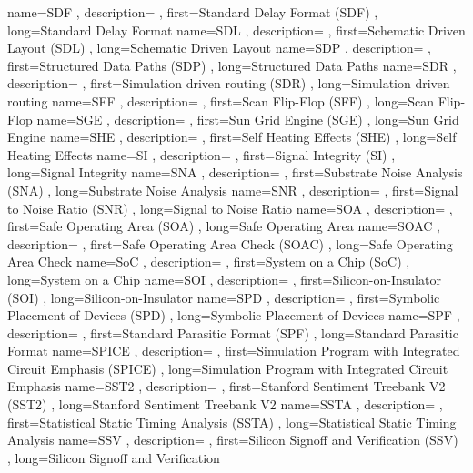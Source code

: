 { name={SDF}
, description={}
, first={Standard Delay Format (SDF)}
, long={Standard Delay Format}
}
{ name={SDL}
, description={}
, first={Schematic Driven Layout (SDL)}
, long={Schematic Driven Layout}
}
{ name={SDP}
, description={}
, first={Structured Data Paths (SDP)}
, long={Structured Data Paths}
}
{ name={SDR}
, description={}
, first={Simulation driven routing (SDR)}
, long={Simulation driven routing}
}
{ name={SFF}
, description={}
, first={Scan Flip-Flop (SFF)}
, long={Scan Flip-Flop}
}
{ name={SGE}
, description={}
, first={Sun Grid Engine (SGE)}
, long={Sun Grid Engine}
}
{ name={SHE}
, description={}
, first={Self Heating Effects (SHE)}
, long={Self Heating Effects}
}
{ name={SI}
, description={}
, first={Signal Integrity (SI)}
, long={Signal Integrity}
}
{ name={SNA}
, description={}
, first={Substrate Noise Analysis (SNA)}
, long={Substrate Noise Analysis}
}
{ name={SNR}
, description={}
, first={Signal to Noise Ratio (SNR)}
, long={Signal to Noise Ratio}
}
{ name={SOA}
, description={}
, first={Safe Operating Area (SOA)}
, long={Safe Operating Area}
}
{ name={SOAC}
, description={}
, first={Safe Operating Area Check (SOAC)}
, long={Safe Operating Area Check}
}
{ name={SoC}
, description={}
, first={System on a Chip (SoC)}
, long={System on a Chip}
}
{ name={SOI}
, description={}
, first={Silicon-on-Insulator (SOI)}
, long={Silicon-on-Insulator}
}
{ name={SPD}
, description={}
, first={Symbolic Placement of Devices (SPD)}
, long={Symbolic Placement of Devices}
}
{ name={SPF}
, description={}
, first={Standard Parasitic Format (SPF)}
, long={Standard Parasitic Format}
}
{ name={SPICE}
, description={}
, first={Simulation Program with Integrated Circuit Emphasis (SPICE)}
, long={Simulation Program with Integrated Circuit Emphasis}
}
{ name={SST2}
, description={}
, first={Stanford Sentiment Treebank V2 (SST2)}
, long={Stanford Sentiment Treebank V2}
}
{ name={SSTA}
, description={}
, first={Statistical Static Timing Analysis (SSTA)}
, long={Statistical Static Timing Analysis}
}
{ name={SSV}
, description={}
, first={Silicon Signoff and Verification (SSV)}
, long={Silicon Signoff and Verification}
}
